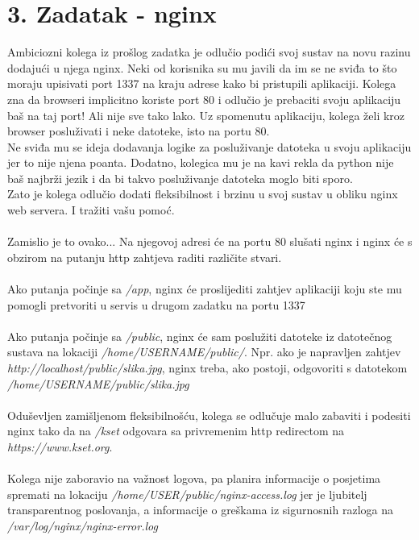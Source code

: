 \documentclass[12pt,a4paper]{article}
\begin{document}
\section*{3. Zadatak - nginx}

Ambiciozni kolega iz prošlog zadatka je odlučio podići svoj sustav na novu razinu dodajući u njega nginx.
Neki od korisnika su mu javili da im se ne sviđa to što moraju upisivati port 1337 na kraju adrese kako bi pristupili aplikaciji.
Kolega zna da browseri implicitno koriste port 80 i odlučio je prebaciti svoju aplikaciju baš na taj port! Ali nije sve tako lako.
Uz spomenutu aplikaciju, kolega želi kroz browser posluživati i neke datoteke, isto na portu 80. \\
Ne sviđa mu se ideja dodavanja logike za posluživanje datoteka u svoju aplikaciju jer to nije njena poanta.
Dodatno, kolegica mu je na kavi rekla da python nije baš najbrži jezik i da bi takvo posluživanje datoteka moglo biti sporo.\\
Zato je kolega odlučio dodati fleksibilnost i brzinu u svoj sustav u obliku nginx web servera. I tražiti vašu pomoć. \\
\\
Zamislio je to ovako... Na njegovoj adresi će na portu 80 slušati nginx
i nginx će s obzirom na putanju http zahtjeva raditi različite stvari. \\
\\
Ako putanja počinje sa \textit{/app}, nginx će proslijediti zahtjev aplikaciji
koju ste mu pomogli pretvoriti u servis u drugom zadatku na portu 1337 \\
\\
Ako putanja počinje sa \textit{/public}, nginx će sam poslužiti datoteke iz datotečnog sustava na lokaciji \textit{/home/USERNAME/public/}.
Npr. ako je napravljen zahtjev \textit{http://localhost/public/slika.jpg}, nginx treba, ako postoji, odgovoriti s datotekom \textit{/home/USERNAME/public/slika.jpg} \\
\\
Oduševljen zamišljenom fleksibilnošću, kolega se odlučuje malo zabaviti i podesiti nginx
tako da na \textit{/kset} odgovara sa privremenim http redirectom na \textit{https://www.kset.org}. \\
\\
Kolega nije zaboravio na važnost logova, pa planira informacije o posjetima spremati na lokaciju
\textit{/home/USER/public/nginx-access.log} jer je ljubitelj transparentnog poslovanja,
a informacije o greškama iz sigurnosnih razloga na \textit{/var/log/nginx/nginx-error.log} \\
\\
\end{document}
